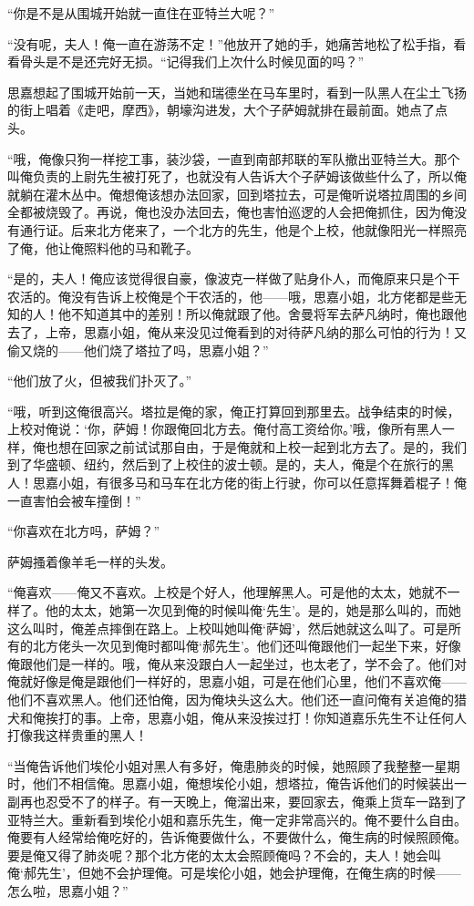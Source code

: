 \par “你是不是从围城开始就一直住在亚特兰大呢？”
\par “没有呢，夫人！俺一直在游荡不定！”他放开了她的手，她痛苦地松了松手指，看看骨头是不是还完好无损。“记得我们上次什么时候见面的吗？”
\par 思嘉想起了围城开始前一天，当她和瑞德坐在马车里时，看到一队黑人在尘土飞扬的街上唱着《走吧，摩西》，朝壕沟进发，大个子萨姆就排在最前面。她点了点头。
\par “哦，俺像只狗一样挖工事，装沙袋，一直到南部邦联的军队撤出亚特兰大。那个叫俺负责的上尉先生被打死了，也就没有人告诉大个子萨姆该做些什么了，所以俺就躺在灌木丛中。俺想俺该想办法回家，回到塔拉去，可是俺听说塔拉周围的乡间全都被烧毁了。再说，俺也没办法回去，俺也害怕巡逻的人会把俺抓住，因为俺没有通行证。后来北方佬来了，一个北方的先生，他是个上校，他就像阳光一样照亮了俺，他让俺照料他的马和靴子。
\par “是的，夫人！俺应该觉得很自豪，像波克一样做了贴身仆人，而俺原来只是个干农活的。俺没有告诉上校俺是个干农活的，他——哦，思嘉小姐，北方佬都是些无知的人！他不知道其中的差别！所以俺就跟了他。舍曼将军去萨凡纳时，俺也跟他去了，上帝，思嘉小姐，俺从来没见过俺看到的对待萨凡纳的那么可怕的行为！又偷又烧的——他们烧了塔拉了吗，思嘉小姐？”
\par “他们放了火，但被我们扑灭了。”
\par “哦，听到这俺很高兴。塔拉是俺的家，俺正打算回到那里去。战争结束的时候，上校对俺说：‘你，萨姆！你跟俺回北方去。俺付高工资给你。’哦，像所有黑人一样，俺也想在回家之前试试那自由，于是俺就和上校一起到北方去了。是的，我们到了华盛顿、纽约，然后到了上校住的波士顿。是的，夫人，俺是个在旅行的黑人！思嘉小姐，有很多马和马车在北方佬的街上行驶，你可以任意挥舞着棍子！俺一直害怕会被车撞倒！”
\par “你喜欢在北方吗，萨姆？”
\par 萨姆搔着像羊毛一样的头发。
\par “俺喜欢——俺又不喜欢。上校是个好人，他理解黑人。可是他的太太，她就不一样了。他的太太，她第一次见到俺的时候叫俺‘先生’。是的，她是那么叫的，而她这么叫时，俺差点摔倒在路上。上校叫她叫俺‘萨姆’，然后她就这么叫了。可是所有的北方佬头一次见到俺时都叫俺‘郝先生’。他们还叫俺跟他们一起坐下来，好像俺跟他们是一样的。哦，俺从来没跟白人一起坐过，也太老了，学不会了。他们对俺就好像是俺是跟他们一样好的，思嘉小姐，可是在他们心里，他们不喜欢俺——他们不喜欢黑人。他们还怕俺，因为俺块头这么大。他们还一直问俺有关追俺的猎犬和俺挨打的事。上帝，思嘉小姐，俺从来没挨过打！你知道嘉乐先生不让任何人打像我这样贵重的黑人！
\par “当俺告诉他们埃伦小姐对黑人有多好，俺患肺炎的时候，她照顾了我整整一星期时，他们不相信俺。思嘉小姐，俺想埃伦小姐，想塔拉，俺告诉他们的时候装出一副再也忍受不了的样子。有一天晚上，俺溜出来，要回家去，俺乘上货车一路到了亚特兰大。重新看到埃伦小姐和嘉乐先生，俺一定非常高兴的。俺不要什么自由。俺要有人经常给俺吃好的，告诉俺要做什么，不要做什么，俺生病的时候照顾俺。要是俺又得了肺炎呢？那个北方佬的太太会照顾俺吗？不会的，夫人！她会叫俺‘郝先生’，但她不会护理俺。可是埃伦小姐，她会护理俺，在俺生病的时候——怎么啦，思嘉小姐？”
